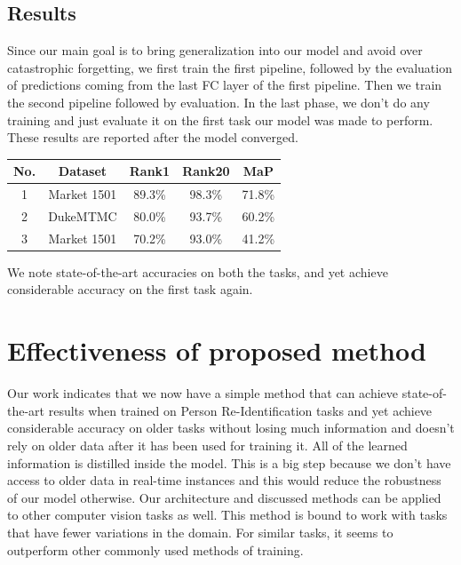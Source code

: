 \documentclass[10pt,twocolumn,letterpaper]{article}
\begin{document}
\subsection{Results}
Since our main goal is to bring generalization into our model and avoid over catastrophic forgetting, we first train the first pipeline, followed by the evaluation of predictions coming from the last FC layer of the first pipeline. Then we train the second pipeline followed by evaluation. In the last phase, we don't do any training and just evaluate it on the first task our model was made to perform. These results are reported after the model converged. 

\begin{table}[h!]
\centering
 \begin{tabular}{||c c c c c||} 
 \hline
 No. & Dataset& Rank1&Rank20&MaP\\ [0.5ex] 
 \hline\hline
 1 & Market 1501  & 89.3\% & 98.3\% & 71.8\% \\ 
 \hline
 2 & DukeMTMC & 80.0\%  & 93.7\%  & 60.2\% \\
 \hline
 3 & Market 1501 & 70.2\%  & 93.0\% & 41.2\% \\  [1ex] 
 \hline
\end{tabular}
\end{table}

We note state-of-the-art accuracies on both the tasks, and yet achieve considerable accuracy on the first task again. 

\section{Effectiveness of proposed method}

Our work indicates that we now have a simple method that can achieve state-of-the-art results when trained on Person Re-Identification tasks and yet achieve considerable accuracy on older tasks without losing much information and doesn't rely on older data after it has been used for training it. All of the learned information is distilled inside the model. This is a big step because we don't have access to older data in real-time instances and this would reduce the robustness of our model otherwise. Our architecture and discussed methods can be applied to other computer vision tasks as well. This method is bound to work with tasks that have fewer variations in the domain. For similar tasks, it seems to outperform other commonly used methods of training.
\end{document}
